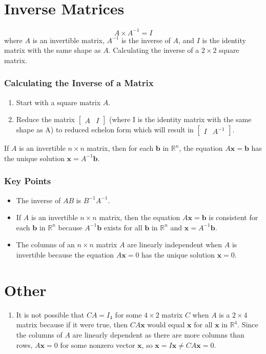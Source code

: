 \documentclass{article}
\begin{document}
\section*{Inverse Matrices}
\[A\times A^{-1}=I\]
where $A$ is an invertible matrix, $A^{-1}$ is the inverse of $A$, and $I$ is the identity matrix with the same shape as $A$.
Calculating the inverse of a $2\times 2$ square matrix.

\subsubsection*{Calculating the Inverse of a Matrix}
\begin{enumerate}
    \item Start with a square matrix $A$.
    \item Reduce the matrix $\begin{bmatrix} A & I \end{bmatrix}$ (where I is the identity matrix with the same shape as A) to reduced echelon form which will result in $\begin{bmatrix} I & A^{-1} \end{bmatrix}$.
\end{enumerate}

If $A$ is an invertible $n\times n$ matrix, then for each $\mathbf{b}$ in $\mathbb{R}^n$, the equation $A\mathbf{x}=\mathbf{b}$ has the unique solution $\mathbf{x}=A^{-1}\mathbf{b}$.

\subsubsection*{Key Points}
\begin{itemize}
    \item The inverse of $AB$ is $B^{-1}A^{-1}$.
    \item If $A$ is an invertible $n\times n$ matrix, then the equation $A\mathbf{x}=\mathbf{b}$ is consistent for each $\mathbf{b}$ in $\mathbb{R}^n$ because $A^{-1}\mathbf{b}$ exists for all $\mathbf{b}$ in $\mathbb{R}^n$ and $\mathbf{x}=A^{-1}\mathbf{b}$.
    \item The columns of an $n\times n$ matrix $A$ are linearly independent when $A$ is invertible because the equation $A\mathbf{x}=0$ has the unique solution $\mathbf{x}=0$.
\end{itemize}

\section*{Other}
\begin{enumerate}
    \item It is not possible that $CA=I_4$ for some $4\times 2$ matrix $C$ when $A$ is a $2\times 4$ matrix because if it were true, then $CA\mathbf{x}$ would equal $\mathbf{x}$ for all $\mathbf{x}$ in $\mathbb{R}^4$. Since the columns of $A$ are linearly dependent as there are more columns than rows, $A\mathbf{x}=0$ for some nonzero vector $\mathbf{x}$, so $\mathbf{x}=I\mathbf{x}\neq CA\mathbf{x}=0$.
\end{enumerate}
\end{document}
